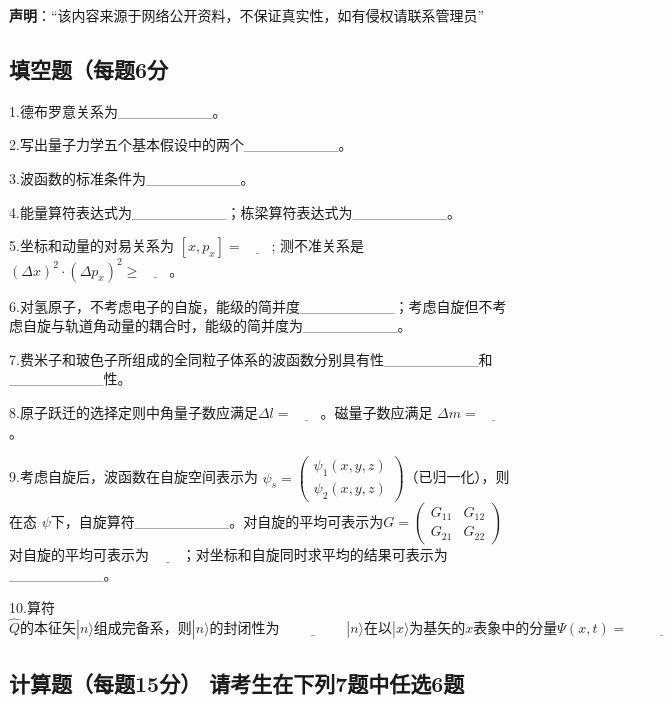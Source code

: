 
\textbf{声明}：“该内容来源于网络公开资料，不保证真实性，如有侵权请联系管理员”

\subsection{填空题（每题6分}

1.德布罗意关系为_________。

2.写出量子力学五个基本假设中的两个_________。

3.波函数的标准条件为_________。

4.能量算符表达式为_________；栋梁算符表达式为_________。

5.坐标和动量的对易关系为 $[x, p_x] = \underline{\quad\quad}$;
          测不准关系是 $(\Delta x)^2 \cdot (\Delta p_x)^2 \geq \underline{\quad\quad}$。

6.对氢原子，不考虑电子的自旋，能级的简并度_________；考虑自旋但不考虑自旋与轨道角动量的耦合时，能级的简并度为_________。

7.费米子和玻色子所组成的全同粒子体系的波函数分别具有性_________和_________性。

8.原子跃迁的选择定则中角量子数应满足$\Delta l = \underline{\quad\quad}$。磁量子数应满足 $\Delta m = \underline{\quad\quad}$。

9.考虑自旋后，波函数在自旋空间表示为 $\psi_s = \begin{pmatrix} \psi_1(x, y, z) \\ \psi_2(x, y, z) \end{pmatrix}$（已归一化），则在态 $\psi$下，自旋算符_________。对自旋的平均可表示为$G = \begin{pmatrix} G_{11} & G_{12} \\ G_{21} & G_{22} \end{pmatrix}$ 对自旋的平均可表示为 $\underline{\quad\quad}$；对坐标和自旋同时求平均的结果可表示为_________。

10.算符$\hat{Q}\text{的本征矢}|n\rangle \text{组成完备系，则}|n\rangle \text{的封闭性为} \underline{\hspace{2cm}}
|n\rangle \text{在以}|x\rangle \text{为基矢的} x \text{表象中的分量}\Psi(x,t)=\underline{\hspace{2cm}}$

\subsection{计算题（每题15分） 请考生在下列7题中任选6题}

